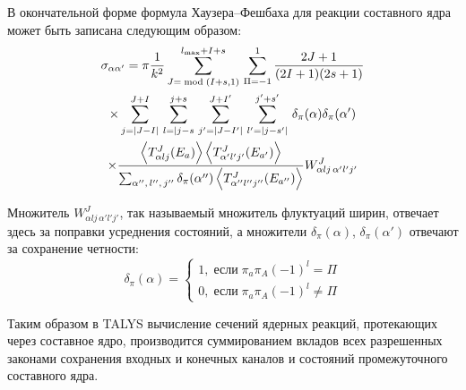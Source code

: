 В окончательной форме формула Хаузера--Фешбаха для реакции составного ядра может быть записана следующим образом:
\begin{equation}
\begin{gathered}
\displaystyle
\sigma_{\alpha \alpha^\prime} = 
\pi \frac{1}{k^2}
\sum_{J=\bmod(I + s, 1)}^{l_\text{max} + I + s} \,
\sum_{\Pi=-1}^1 \frac{2J + 1}{(2I + 1)(2s + 1)} \\ \times
\sum_{j=|J-I|}^{J+I} \,
\sum_{l=|j-s}^{j+s} \,
\sum_{j^\prime=|J-I^\prime|}^{J+I^\prime} \,
\sum_{l^\prime=|j-s^\prime|}^{j^\prime+s^\prime} \,
\delta_\pi(\alpha) \delta_\pi(\alpha^\prime) \\ \times
\frac{
  \expval{T_{\alpha l j}^J(E_a)}
  \expval{T_{\alpha^\prime l^\prime j^\prime}^J(E_{a'})}
}{
  \sum_{\alpha'',\, l'',\, j''} \delta_\pi(\alpha'') 
  \expval{T_{\alpha'' l'' j''}^J(E_{a''})}
}
W^J_{\alpha l j \, \alpha' l' j'}
\end{gathered}
\label{eq:talys_cs}
\end{equation}

Множитель $W^J_{\alpha l j \, \alpha' l' j'}$, так называемый множитель флуктуаций ширин, отвечает здесь за поправки усреднения состояний, а множители $\delta_\pi(\alpha)$, $\delta_\pi(\alpha')$ отвечают за сохранение четности:
\begin{equation}
\delta_\pi(\alpha) = \begin{cases}
1, \;\text{если}\; \pi_a \pi_A (-1)^l = \Pi\\
0, \;\text{если}\; \pi_a \pi_A (-1)^l \neq \Pi
\end{cases}
\end{equation}

Таким образом в TALYS вычисление сечений ядерных реакций, протекающих через составное ядро, производится суммированием вкладов всех разрешенных законами сохранения входных и конечных каналов и состояний промежуточного составного ядра.


